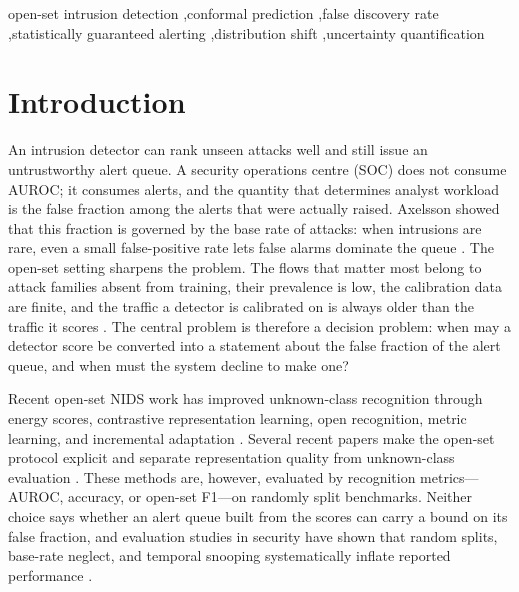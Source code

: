 \documentclass[a4paper,fleqn]{cas-dc}
\begin{document}
\begin{keywords}
open-set intrusion detection \sep conformal prediction \sep false discovery rate
\sep statistically guaranteed alerting \sep distribution shift
\sep uncertainty quantification
\end{keywords}

\maketitle

\pagestyle{fancy}
\fancyhf{}
\fancyfoot[C]{\footnotesize\thepage}
\renewcommand{\headrulewidth}{0pt}
\renewcommand{\footrulewidth}{0pt}
\fancypagestyle{plain}{\fancyhf{}\renewcommand{\headrulewidth}{0pt}%
  \renewcommand{\footrulewidth}{0pt}}
\thispagestyle{empty}

\section{Introduction}
\label{sec:intro}

An intrusion detector can rank unseen attacks well and still issue an untrustworthy alert queue. A security operations centre (SOC) does not consume AUROC; it consumes alerts, and the quantity that determines analyst workload is the false fraction among the alerts that were actually raised. Axelsson showed that this fraction is governed by the base rate of attacks: when intrusions are rare, even a small false-positive rate lets false alarms dominate the queue \cite{axelsson2000baserate}. The open-set setting sharpens the problem. The flows that matter most belong to attack families absent from training, their prevalence is low, the calibration data are finite, and the traffic a detector is calibrated on is always older than the traffic it scores \cite{sommer2010outside}. The central problem is therefore a decision problem: when may a detector score be converted into a statement about the false fraction of the alert queue, and when must the system decline to make one?

Recent open-set NIDS work has improved unknown-class recognition through energy scores, contrastive representation learning, open recognition, metric learning, and incremental adaptation \cite{souza2025efc,wilkie2026closr,du2025ori,docpp2023,renoir2021,zhao2024foss,farrukh2024ais,uddin2024usfad,cevallos2025hero,mnet2024canopen}. Several recent papers make the open-set protocol explicit and separate representation quality from unknown-class evaluation \cite{comnet2025trafficllm,cevallos2025hero}. These methods are, however, evaluated by recognition metrics---AUROC, accuracy, or open-set F1---on randomly split benchmarks. Neither choice says whether an alert queue built from the scores can carry a bound on its false fraction, and evaluation studies in security have shown that random splits, base-rate neglect, and temporal snooping systematically inflate reported performance \cite{arp2022dos,pendlebury2019tesseract,cicids2021case}.
\end{document}
